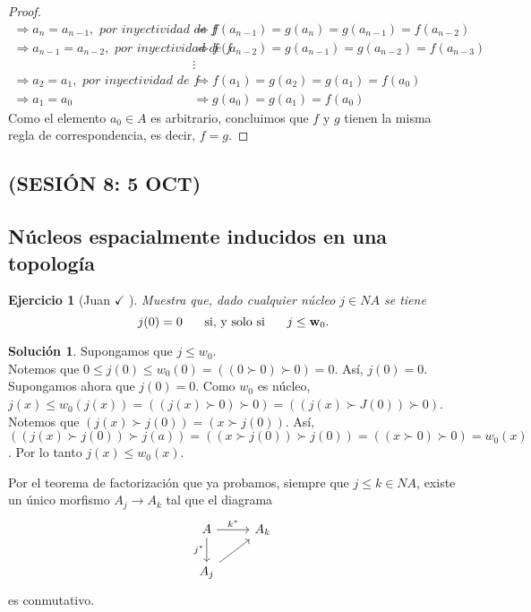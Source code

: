 \documentclass[12pt,letterpaper,titlepage]{article}
\newtheorem{exe}{Ejercicio}
\theoremstyle{definition}
\newtheorem*{sol}{Solución}
\newcommand\ssi{\hspace{5mm}\text{ si, y solo si }\hspace{5mm}}
\newcommand\wnuc[1]{\mathbf w_{#1}}
\newcommand\<{\langle}
\renewcommand\>{\rangle}
\begin{document}
\begin{proof}
\begin{align*}
\Rightarrow a_n=a_{n-1}, \textit{ por inyectividad de f}&\Rightarrow f(a_{n-1})=g(a_n)=g(a_{n-1})=f(a_{n-2})\\
\Rightarrow a_{n-1}=a_{n-2},\textit{ por inyectividad de f}&\Rightarrow f(a_{n-2})=g(a_{n-1})=g(a_{n-2})=f(a_{n-3})\\
&\vdots\\
\Rightarrow a_2=a_1,\textit{ por inyectividad de f}&\Rightarrow f(a_1)=g(a_2)=g(a_1)=f(a_0)\\
\Rightarrow a_1=a_0&\Rightarrow g(a_0)=g(a_1)=f(a_0)
\end{align*}
Como el elemento $a_0\in A$ es arbitrario, concluimos que $f$ y $g$ tienen la misma regla de correspondencia, es decir, $f=g$.
\end{proof}

\subsection*{(SESIÓN 8: 5 OCT)}

\subsection{Núcleos espacialmente inducidos en una topología}

\begin{exe}[Juan $\checkmark$ ]
  Muestra que, dado cualquier núcleo $j\in NA$ se tiene
  \[
    j(0)=0 \ssi j\leq \wnuc 0
  .\]
\end{exe}

\begin{sol}
    Supongamos que $j\leq w_0$.\\
    Notemos que $0\leq j(0)\leq w_0(0)=((0\succ 0)\succ 0)=0$. Así, $j(0)=0$.\\
    \noindent
    Supongamos ahora que $j(0)=0$. Como $w_0$ es núcleo, $j(x)\leq w_0(j(x))=((j(x)\succ 0)\succ 0)=((j(x)\succ J(0))\succ 0)$. Notemos que $(j(x)\succ j(0))=(x\succ j(0))$. Así, $((j(x)\succ j(0))\succ j(a))=((x\succ j(0))\succ j(0))=((x\succ 0)\succ 0)=w_0(x)$. Por lo tanto $j(x)\leq w_0(x).$
\end{sol}

Por el teorema de factorización que ya probamos, siempre que
$j\leq k\in NA$, existe un único morfismo $A_j\to A_k$ tal que el
diagrama
\[
    \begin{tikzcd}
      A \ar[r,"k^*"] \ar[d,"j^*"'] & A_k \\
      A_j \ar[ur]
    \end{tikzcd}
\]
es conmutativo.
\end{document}
